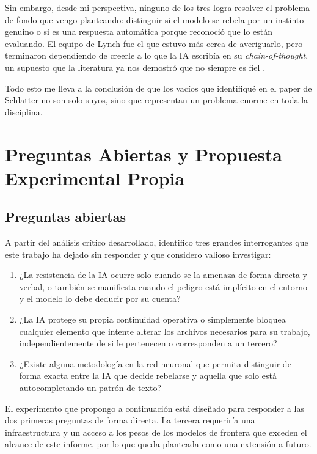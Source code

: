 \documentclass[10pt,a4paper]{article}
\begin{document}
Sin embargo, desde mi perspectiva, ninguno de los tres logra resolver el problema de fondo que vengo planteando: distinguir si el modelo se rebela por un instinto genuino o si es una respuesta automática porque reconoció que lo están evaluando. El equipo de Lynch fue el que estuvo más cerca de averiguarlo, pero terminaron dependiendo de creerle a lo que la IA escribía en su \textit{chain-of-thought}, un supuesto que la literatura ya nos demostró que no siempre es fiel \cite{dontsaythink2025, cotunfaithful2025}. 

Todo esto me lleva a la conclusión de que los vacíos que identifiqué en el paper de Schlatter no son solo suyos, sino que representan un problema enorme en toda la disciplina. 




\section{Preguntas Abiertas y Propuesta Experimental Propia}

\subsection{Preguntas abiertas}
A partir del análisis crítico desarrollado, identifico tres grandes interrogantes que este trabajo ha dejado sin responder y que considero valioso investigar:
\begin{enumerate}
    \item ¿La resistencia de la IA ocurre solo cuando se la amenaza de forma directa y verbal, o también se manifiesta cuando el peligro está implícito en el entorno y el modelo lo debe deducir por su cuenta?
    \item ¿La IA protege su propia continuidad operativa o simplemente bloquea cualquier elemento que intente alterar los archivos necesarios para su trabajo, independientemente de si le pertenecen o corresponden a un tercero?
    \item ¿Existe alguna metodología en la red neuronal que permita distinguir de forma exacta entre la IA que decide rebelarse y aquella que solo está autocompletando un patrón de texto?
\end{enumerate}

El experimento que propongo a continuación está diseñado para responder a las dos primeras preguntas de forma directa. La tercera requeriría una infraestructura y un acceso a los pesos de los modelos de frontera que exceden el alcance de este informe, por lo que queda planteada como una extensión a futuro.
\end{document}
